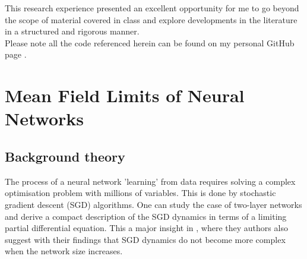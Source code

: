\documentclass{article}
\begin{document}
This research experience presented an excellent opportunity for me to go beyond the scope of material covered in class and explore developments in the literature in a structured and rigorous manner. \\

Please note all the code referenced herein can be found on my personal GitHub page \cite{Tassopoulos_Imperial_Summer_Research_2023} . \\

\newpage
\section{Mean Field Limits of Neural Networks}\label{sec: mean field neural net}

\subsection{Background theory}\label{sec: neural net single layer}

The process of a neural network 'learning' from data requires solving a complex optimisation problem with millions of variables. This is done by stochastic gradient descent (SGD) algorithms. One can study the case of two-layer networks and derive a compact description of the SGD dynamics in terms of a limiting partial differential equation. This a major insight in \cite{Mei_2018}, where they authors also suggest with their findings that SGD dynamics do not become more complex when the network size increases.\\ 
\end{document}
